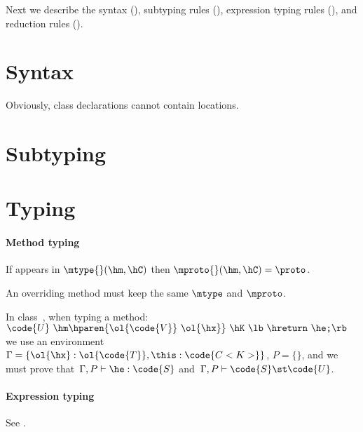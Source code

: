 \documentclass[10pt,a4paper]{article}
\begin{document}
Next we describe the syntax (),
    subtyping rules (),
    expression typing rules (),
    and reduction rules ().

\section{Syntax}
Obviously, class declarations cannot contain locations.

\section{Subtyping}


\section{Typing}
\paragraph{Method typing}
If \proto appears in $\mtype{}(\hm,\hC)$ then $\mproto{}(\hm,\hC)=\proto$.

An overriding method must keep the same $\mtype$ and $\mproto$.

In class~\hC, when typing a method:
        $\code{U} ~ \hm\hparen{\ol{\code{V}} ~ \ol{\hx}} ~ \hK~ \lb\ \hreturn ~ \he\texttt{;} \rb$\\
        we use an environment~$\Gamma=\{\ol{\hx}:\ol{\code{T}}, \this:\code{C<K>}\}$, $P=\{\}$,
        and we must prove that~$\Gamma,P \vdash \he:\code{S}$
        and~$\Gamma,P \vdash \code{S} \st \code{U}$.

\paragraph{Expression typing}
See .
\end{document}
